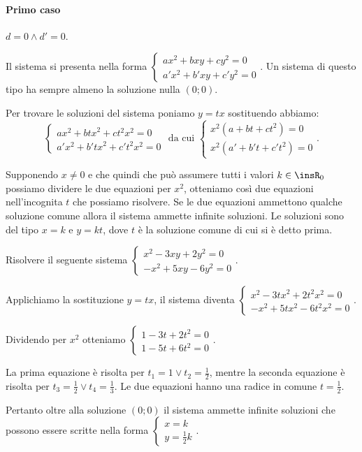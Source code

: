 \paragraph{Primo caso} \(d=0 \wedge d'=0\).

Il sistema si presenta nella forma \(\left\{\begin{array}{l}{{ax}^2+{bxy}+{cy}^2=0}\\{a'x^2+b'{xy}+c'y^2=0}\end{array}\right.\). Un sistema di questo tipo ha sempre almeno la soluzione nulla \( (0; 0) \).

Per trovare le soluzioni del sistema poniamo \(y={tx}\) sostituendo abbiamo: \[ \left\{\begin{array}{l}{{ax}^2+{btx}^2+{ct}^2x^2=0}\\{a'x^2+b'{tx}^2+c't^2x^2=0}\end{array}\right. \text{ da cui } \left\{\begin{array}{l}{x^2(a+{bt}+{ct}^2)=0}\\{x^2(a'+b't+c't^2)=0}\end{array}\right.. \]

Supponendo \(x\neq 0\) e che quindi che può assumere tutti i valori \(k\in \insR_0\) possiamo dividere le due equazioni per \(x^2\), otteniamo così due equazioni nell'incognita \(t\) che possiamo risolvere. Se le due equazioni ammettono qualche soluzione comune allora il sistema ammette infinite soluzioni. Le soluzioni sono del tipo \(x=k\) e \(y={kt}\), dove \(t\) è la soluzione comune di cui si è detto prima.

\begin{exrig}
\begin{esempio}
Risolvere il seguente sistema \(\left\{\begin{array}{l}x^2-3{xy}+2y^2=0 \\-x^2+5{xy}-6y^2=0 \end{array}\right.\).

Applichiamo la sostituzione \(y={tx}\), il sistema diventa \(\left\{\begin{array}{l}x^2-3{tx}^2+2t^2x^2=0 \\-x^2+5{tx}^2-6t^2x^2=0 \end{array}\right.\).

Dividendo per \(x^2\) otteniamo \(\left\{\begin{array}{l}1-3t+2t^2=0 \\1-5t+6t^2=0 \end{array}\right.\).

La prima equazione è risolta per \(t_1=1\vee t_2=\frac 1 2\), mentre la seconda equazione è risolta per \(t_3=\frac 1 2\vee t_4=\frac 1 3\). Le due equazioni hanno una radice in comune \(t=\frac 1 2\).

Pertanto oltre alla soluzione \((0;0)\) il sistema ammette infinite soluzioni che possono essere scritte nella forma \(\left\{\begin{array}{l}x=k \\y=\frac 1 2k \end{array}\right.\).
\end{esempio}
\end{exrig}

